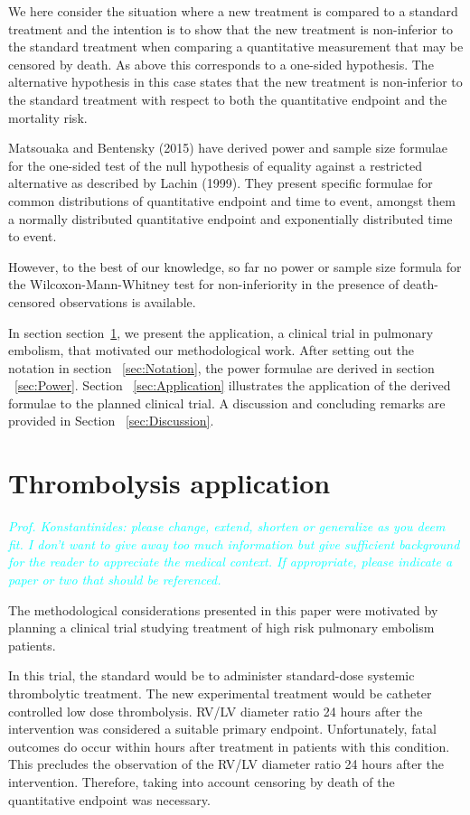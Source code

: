 \documentclass[bimj,fleqn]{w-art}\usepackage[]{graphicx}\usepackage[]{color}
\theoremstyle{plain}
\theoremstyle{definition}
\begin{document}
  We here consider the situation where a new treatment is compared to a standard
  treatment and the intention is to show that the new treatment is non-inferior
  to the standard treatment when comparing a quantitative measurement that may
  be censored by death. As above this corresponds to a one-sided hypothesis.
  The alternative hypothesis in this case states that the new treatment is
  non-inferior to the standard treatment with respect to both the quantitative
  endpoint and the mortality risk.

  Matsouaka and Bentensky (2015) have derived power and sample size formulae for
  the one-sided test of the null hypothesis of equality against a restricted
  alternative as described by Lachin (1999). They present specific formulae for
  common distributions of quantitative endpoint and time to event, amongst them
  a normally distributed quantitative endpoint and exponentially distributed
  time to event.

  However, to the best of our knowledge, so far no power or sample size formula
  for the Wilcoxon-Mann-Whitney test for non-inferiority in the presence of
  death-censored observations is available.

  In section section~\ref{sec:ThrombolysisApplication}, we present the
  application, a clinical trial in pulmonary embolism, that motivated our
  methodological work. After setting out the notation in section
  ~\ref{sec:Notation}, the power formulae are derived in section ~\ref{sec:Power}.
  Section ~\ref{sec:Application} illustrates the application of the derived
  formulae to the planned clinical trial. A discussion and concluding remarks
  are provided in Section ~\ref{sec:Discussion}.


  \section{Thrombolysis application}
  \label{sec:ThrombolysisApplication}
  \textcolor{cyan}{\textit{Prof. Konstantinides: please change, extend, shorten or generalize as
  you deem fit. I don't want to give away too much information but give sufficient
  background for the reader to appreciate the medical context. If appropriate,
  please indicate a paper or two that should be referenced.}}

  The methodological considerations presented in this paper were motivated by
  planning a clinical trial studying treatment of high risk pulmonary embolism
  patients.

  In this trial, the standard would be to administer standard-dose systemic
  thrombolytic treatment. The new experimental treatment would be catheter
  controlled low dose thrombolysis. RV/LV diameter ratio 24 hours after the
  intervention was considered a suitable primary endpoint. Unfortunately, fatal
  outcomes do occur within hours after treatment in patients with this condition.
  This precludes the observation of the RV/LV diameter ratio 24 hours after the
  intervention. Therefore, taking into account censoring by death of the
  quantitative endpoint was necessary.
\end{document}
